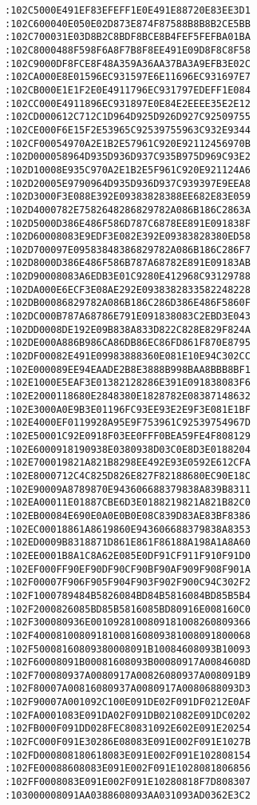 \begin{lstlisting}[language={}, basicstyle=\scriptsize, caption=Машинний код]
:102C5000E491EF83EFEFF1E0E491E88720E83EE3D1
:102C600040E050E02D873E874F87588B8B8B2CE5BB
:102C700031E03D8B2C8BDF8BCE8B4FEF5FEFBA01BA
:102C8000488F598F6A8F7B8F8EE491E09D8F8C8F58
:102C9000DF8FCE8F48A359A36AA37BA3A9EFB3E02C
:102CA000E8E01596EC931597E6E11696EC931697E7
:102CB000E1E1F2E0E4911796EC931797EDEFF1E084
:102CC000E4911896EC931897E0E84E2EEEE35E2E12
:102CD000612C712C1D964D925D926D927C92509755
:102CE000F6E15F2E53965C92539755963C932E9344
:102CF00054970A2E1B2E57961C920E92112456970B
:102D000058964D935D936D937C935B975D969C93E2
:102D10008E935C970A2E1B2E5F961C920E921124A6
:102D20005E9790964D935D936D937C939397E9EEA8
:102D3000F3E088E392E09383828388EE682E83E059
:102D4000782E7582648286829782A086B186C2863A
:102D5000D386E486F586D787C6878EE891E091838F
:102D60008083E9EDF3E082E392E09383828380ED58
:102D700097E09583848386829782A086B186C286F7
:102D8000D386E486F586B787A68782E891E09183AB
:102D90008083A6EDB3E01C9280E412968C93129788
:102DA000E6ECF3E08AE292E0938382833582248228
:102DB00086829782A086B186C286D386E486F5860F
:102DC000B787A68786E791E091838083C2EBD3E043
:102DD0008DE192E09B838A833D822C828E829F824A
:102DE000A886B986CA86DB86EC86FD861F870E8795
:102DF00082E491E09983888360E081E10E94C302CC
:102E000089EE94EAADE2B8E3888B998BAA8BBB8BF1
:102E1000E5EAF3E01382128286E391E091838083F6
:102E2000118680E2848380E1828782E08387148632
:102E3000A0E9B3E01196FC93EE93E2E9F3E081E1BF
:102E4000EF0119928A95E9F753961C92539754967D
:102E50001C92E0918F03EE0FFF0BEA59FE4F808129
:102E6000918190938E0380938D03C0E8D3E0188204
:102E700019821A821B8298EE492E93E0592E612CFA
:102E8000712C4C825D826E827F82188680EC90E18C
:102E90009A8789870E943606688379838A839B8311
:102EA00011E01887CBE6D3E0188219821A821B82C0
:102EB00084E690E0A0E0B0E08C839D83AE83BF8386
:102EC00018861A8619860E943606688379838A8353
:102ED0009B8318871D861E861F86188A198A1A8A60
:102EE0001B8A1C8A62E085E0DF91CF911F910F91D0
:102EF000FF90EF90DF90CF90BF90AF909F908F901A
:102F00007F906F905F904F903F902F900C94C302F2
:102F1000789484B5826084BD84B5816084BD85B5B4
:102F2000826085BD85B5816085BD80916E008160C0
:102F300080936E0010928100809181008260809366
:102F40008100809181008160809381008091800068
:102F50008160809380008091B10084608093B10093
:102F60008091B00081608093B00080917A0084608D
:102F700080937A0080917A00826080937A008091B9
:102F80007A00816080937A0080917A0080688093D3
:102F90007A001092C100E091DE02F091DF0212E0AF
:102FA0001083E091DA02F091DB021082E091DC0202
:102FB000F091DD028FEC80831092E602E091E20254
:102FC000F091E30286E08083E091E002F091E1027B
:102FD000808180618083E091E002F091E102808154
:102FE00088608083E091E002F091E1028081806856
:102FF0008083E091E002F091E10280818F7D808307
:103000008091AA0388608093AA031093AD0362E3C2

\end{lstlisting}
